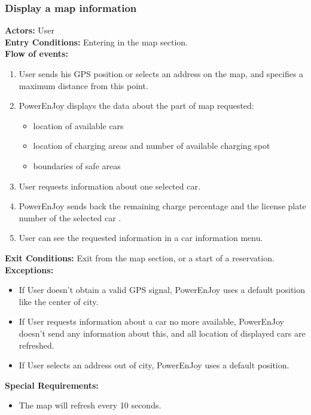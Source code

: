 


\subsubsection{Display a map information}
%
\textbf{Actors:}
User\\
%
\textbf{Entry Conditions:}
Entering in the map section. \\
%
\textbf{Flow of events:}
\begin{enumerate}
\item User sends his GPS position or selects an address on the map, and specifies a maximum distance from this point.
\item PowerEnJoy displays the data about the part of map requested: 
\begin{itemize}
\item location of available cars
\item location of charging areas and number of available charging spot
\item boundaries of safe areas 
\end{itemize}
\item User requests information about one selected car.
\item PowerEnJoy sends back the remaining charge percentage and the license plate number of the selected car .
\item User can see the requested information in a car information menu.
\end{enumerate}
%
\textbf{Exit Conditions:}
Exit from the map section, or a start of a reservation. \\
%
\textbf{Exceptions:}
\begin{itemize}
\item If User doesn't obtain a valid GPS signal, PowerEnJoy uses a default position like the center of city.
\item If User requests information about a car no more available, PowerEnJoy doesn't send any information about this, and all location of displayed cars are refreshed. 
\item If User selects an address out of city, PowerEnJoy uses a default position.
\end{itemize}
%
\textbf{Special Requirements:}
\begin{itemize}
\item The map will refresh every 10 seconds.
\end{itemize}


